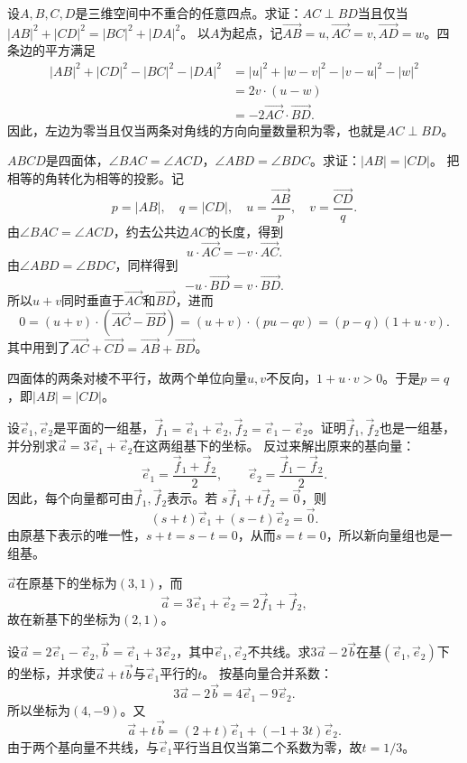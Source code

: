 设\(A,B,C,D\)是三维空间中不重合的任意四点。求证：\(AC\perp BD\)当且仅当\(|AB|^2+|CD|^2=|BC|^2+|DA|^2\)。
\solutionanswer
以\(A\)为起点，记\(\vec{AB}=u,\vec{AC}=v,\vec{AD}=w\)。四条边的平方满足
\[
\begin{aligned}
|AB|^2+|CD|^2-|BC|^2-|DA|^2
&=|u|^2+|w-v|^2-|v-u|^2-|w|^2\\
&=2v\cdot(u-w)\\
&=-2\vec{AC}\cdot\vec{BD}.
\end{aligned}
\]
因此，左边为零当且仅当两条对角线的方向向量数量积为零，也就是\(AC\perp BD\)。


\(ABCD\)是四面体，\(\angle BAC=\angle ACD\)，\(\angle ABD=\angle BDC\)。求证：\(|AB|=|CD|\)。
\solutionanswer
把相等的角转化为相等的投影。记
\[
p=|AB|,\quad q=|CD|,\quad
u=\frac{\vec{AB}}p,\quad v=\frac{\vec{CD}}q.
\]
由\(\angle BAC=\angle ACD\)，约去公共边\(AC\)的长度，得到
\[
u\cdot\vec{AC}=-v\cdot\vec{AC}.
\]
由\(\angle ABD=\angle BDC\)，同样得到
\[
-u\cdot\vec{BD}=v\cdot\vec{BD}.
\]
所以\(u+v\)同时垂直于\(\vec{AC}\)和\(\vec{BD}\)，进而
\[
0=(u+v)\cdot(\vec{AC}-\vec{BD})
=(u+v)\cdot(pu-qv)
=(p-q)(1+u\cdot v).
\]
其中用到了\(\vec{AC}+\vec{CD}=\vec{AB}+\vec{BD}\)。

四面体的两条对棱不平行，故两个单位向量\(u,v\)不反向，\(1+u\cdot v>0\)。于是\(p=q\)，即\(|AB|=|CD|\)。


设\(\vec e_1,\vec e_2\)是平面的一组基，\(\vec f_1=\vec e_1+\vec e_2,\vec f_2=\vec e_1-\vec e_2\)。证明\(\vec f_1,\vec f_2\)也是一组基，并分别求\(\vec a=3\vec e_1+\vec e_2\)在这两组基下的坐标。
\solutionanswer
反过来解出原来的基向量：
\[
\vec e_1=\frac{\vec f_1+\vec f_2}2,\qquad
\vec e_2=\frac{\vec f_1-\vec f_2}2.
\]
因此，每个向量都可由\(\vec f_1,\vec f_2\)表示。若
\(s\vec f_1+t\vec f_2=\vec0\)，则
\[
(s+t)\vec e_1+(s-t)\vec e_2=\vec0.
\]
由原基下表示的唯一性，\(s+t=s-t=0\)，从而\(s=t=0\)，所以新向量组也是一组基。

\(\vec a\)在原基下的坐标为\((3,1)\)，而
\[
\vec a=3\vec e_1+\vec e_2=2\vec f_1+\vec f_2,
\]
故在新基下的坐标为\((2,1)\)。


设\(\vec a=2\vec e_1-\vec e_2,\vec b=\vec e_1+3\vec e_2\)，其中\(\vec e_1,\vec e_2\)不共线。求\(3\vec a-2\vec b\)在基\((\vec e_1,\vec e_2)\)下的坐标，并求使\(\vec a+t\vec b\)与\(\vec e_1\)平行的\(t\)。
\solutionanswer
按基向量合并系数：
\[
3\vec a-2\vec b=4\vec e_1-9\vec e_2.
\]
所以坐标为\((4,-9)\)。又
\[
\vec a+t\vec b=(2+t)\vec e_1+(-1+3t)\vec e_2.
\]
由于两个基向量不共线，与\(\vec e_1\)平行当且仅当第二个系数为零，故\(t=1/3\)。


